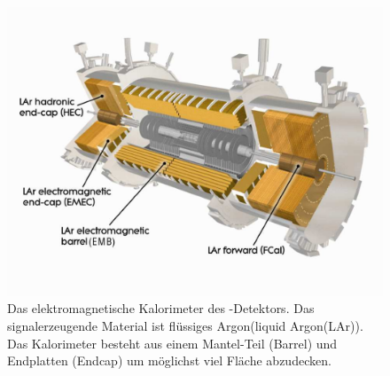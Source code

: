 \begin{figure}
\centering
\includegraphics[scale=0.45]{input/LAr_Labeled.pdf}\caption{Das elektromagnetische Kalorimeter des \atlas-Detektors. Das signalerzeugende Material ist flüssiges Argon(liquid Argon(LAr))\cite{Aad:2014una}. Das Kalorimeter besteht aus einem Mantel-Teil (Barrel) und Endplatten (Endcap) um möglichst viel Fläche abzudecken.}
\end{figure}


